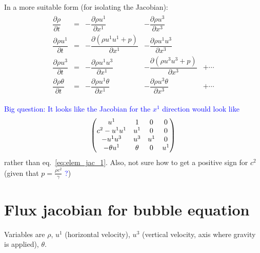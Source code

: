 \documentclass{article}
\newcommand{\todo}[1]{\textcolor{blue}{#1}}
\begin{document}
In a more suitable form (for isolating the Jacobian):
\begin{align}
    \begin{matrix}
    \dfrac{\partial \rho}{\partial t} &=
        & - \dfrac{\partial \rho u^1}{\partial x^1}
        & - \dfrac{\partial \rho u^3}{\partial x^3} \\
    \dfrac{\partial \rho u^1}{\partial t} &=
        & - \dfrac{\partial(\rho u^1u^1 + p)}{\partial x^1}
        & - \dfrac{\partial \rho u^1u^3}{\partial x^3} \\
    \dfrac{\partial \rho u^3}{\partial t} &=
        & - \dfrac{\partial\rho u^1u^3}{\partial x^1}
        & - \dfrac{\partial(\rho u^3u^3 + p)}{\partial x^3} 
        & + \cdots \\
    \dfrac{\partial \rho \theta}{\partial t} &=
        & - \dfrac{\partial \rho u^1 \theta}{\partial x^1}
        & - \dfrac{\partial \rho u^3 \theta}{\partial x^3}
        & + \cdots
    \end{matrix}
\end{align}

\todo{Big question: It looks like the Jacobian for the $x^1$ direction would look like}
\begin{equation}
    \left( \begin{matrix}
        u^1 & 1 & 0 & 0 \\
        c^2 - u^1u^1 & u^1 & 0 & 0 \\ 
        -u^1 u^3 & u^3 & u^1 & 0 \\
        -\theta u^1 & \theta & 0 & u^1
    \end{matrix} \right)
\end{equation}
rather than eq.~\ref{eq:elem_jac_1}. Also, not sure how to get a positive sign for $c^2$ (given that $p = \frac{\rho c^2}{\gamma}$ \todo{?})


\section{Flux jacobian for bubble equation}\label{app:flux_jacobian}

Variables are $\rho$, $u^1$ (horizontal velocity), $u^3$ (vertical velocity, axis where gravity is applied), $\theta$.
\end{document}
